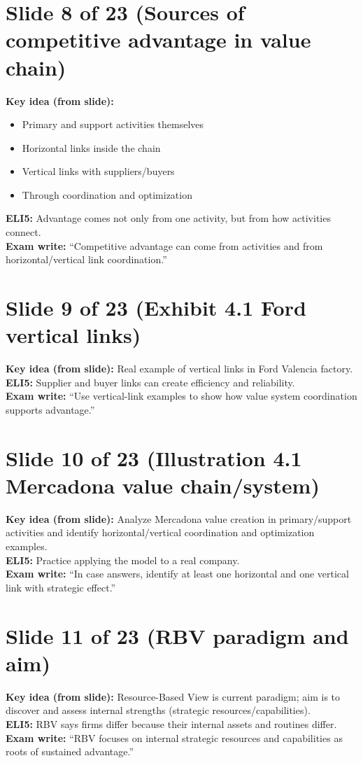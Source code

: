 \documentclass[11pt,a4paper]{article}
\begin{document}
\section*{Slide 8 of 23 (Sources of competitive advantage in value chain)}
\textbf{Key idea (from slide):}
\begin{itemize}
  \item Primary and support activities themselves
  \item Horizontal links inside the chain
  \item Vertical links with suppliers/buyers
  \item Through coordination and optimization
\end{itemize}
\textbf{ELI5:} Advantage comes not only from one activity, but from how activities connect.\\
\textbf{Exam write:} ``Competitive advantage can come from activities and from horizontal/vertical link coordination.''

\section*{Slide 9 of 23 (Exhibit 4.1 Ford vertical links)}
\textbf{Key idea (from slide):} Real example of vertical links in Ford Valencia factory.\\
\textbf{ELI5:} Supplier and buyer links can create efficiency and reliability.\\
\textbf{Exam write:} ``Use vertical-link examples to show how value system coordination supports advantage.''

\section*{Slide 10 of 23 (Illustration 4.1 Mercadona value chain/system)}
\textbf{Key idea (from slide):} Analyze Mercadona value creation in primary/support activities and identify horizontal/vertical coordination and optimization examples.\\
\textbf{ELI5:} Practice applying the model to a real company.\\
\textbf{Exam write:} ``In case answers, identify at least one horizontal and one vertical link with strategic effect.''

\section*{Slide 11 of 23 (RBV paradigm and aim)}
\textbf{Key idea (from slide):} Resource-Based View is current paradigm; aim is to discover and assess internal strengths (strategic resources/capabilities).\\
\textbf{ELI5:} RBV says firms differ because their internal assets and routines differ.\\
\textbf{Exam write:} ``RBV focuses on internal strategic resources and capabilities as roots of sustained advantage.''
\end{document}
